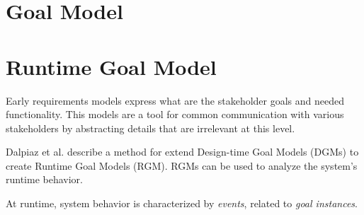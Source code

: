 \section{Goal Model}



\section{Runtime Goal Model}
Early requirements models express what are the stakeholder goals and needed functionality. This models are a tool for common communication with various stakeholders by abstracting details that are irrelevant at this level\cite{dalpiaz_runtime_2013}.

Dalpiaz et al.\cite{dalpiaz_runtime_2013} describe a method for extend Design-time Goal Models (DGMs) to create Runtime Goal Models (RGM). RGMs can be used to analyze the system's runtime behavior.

At runtime, system behavior is characterized by \emph{events}, related to \emph{goal instances}.
